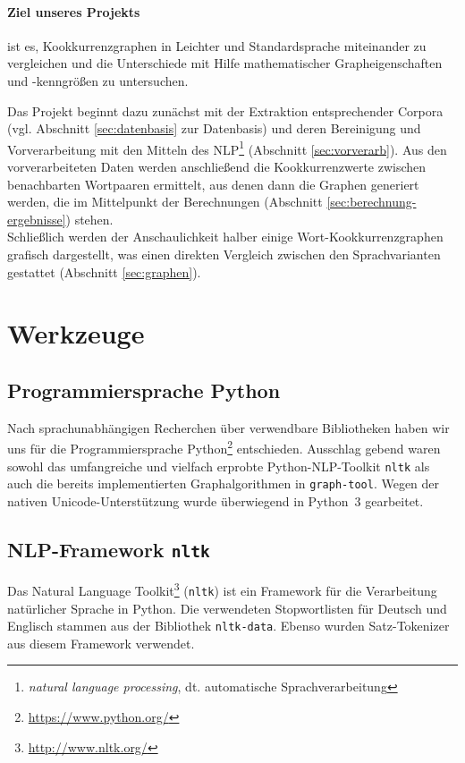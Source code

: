 \documentclass[11pt, a4paper]{article}
\begin{document}
\paragraph{Ziel unseres Projekts} ist es, Kookkurrenzgraphen in Leichter und
Standardsprache miteinander zu vergleichen und die Unterschiede mit Hilfe
mathematischer Grapheigenschaften und -kenngrößen zu untersuchen.

Das Projekt beginnt dazu zunächst mit der Extraktion entsprechender Corpora
(vgl. Abschnitt \ref{sec:datenbasis} zur Datenbasis) und
deren Bereinigung und Vorverarbeitung mit den Mitteln des NLP\footnote{
\emph{natural language processing}, dt. automatische Sprachverarbeitung}
(Abschnitt \ref{sec:vorverarb}).
Aus den vorverarbeiteten Daten werden anschließend die Kookkurrenzwerte
zwischen benachbarten Wortpaaren ermittelt, aus denen
dann die Graphen generiert werden, die im Mittelpunkt der Berechnungen
(Abschnitt \ref{sec:berechnung-ergebnisse}) stehen.\\
Schließlich werden der Anschaulichkeit halber einige Wort-Kookkurrenzgraphen
grafisch dargestellt, was einen direkten Vergleich zwischen den Sprachvarianten
gestattet (Abschnitt \ref{sec:graphen}).


\section{Werkzeuge}

\subsection{Programmiersprache Python}
Nach sprachunabhängigen Recherchen über verwendbare Bibliotheken haben wir uns
für die Programmiersprache Python\footnote{\url{https://www.python.org/}}
entschieden.
Ausschlag gebend waren sowohl das umfangreiche und vielfach erprobte
Python-NLP-Toolkit \texttt{nltk} als auch die bereits implementierten
Graphalgorithmen in \texttt{graph-tool}.
Wegen der nativen Unicode-Unterstützung wurde überwiegend in Python~3 gearbeitet.

\subsection{NLP-Framework \texttt{nltk}}
Das Natural Language Toolkit\footnote{\url{http://www.nltk.org/}} (\texttt{nltk}) ist
ein Framework f\"ur die Verarbeitung natürlicher Sprache in Python.
Die verwendeten Stopwortlisten für Deutsch und Englisch stammen aus der
Bibliothek \texttt{nltk-data}.
Ebenso wurden Satz-Tokenizer aus diesem Framework verwendet.
\end{document}
